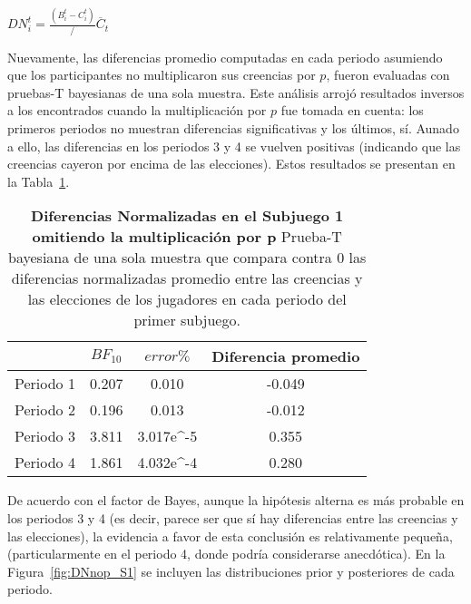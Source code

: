 \begin{center}
$DN_i^t=  \frac{(B_i^t- C_i^t)}/{\overline{C}_t}$ \\
\end{center}

Nuevamente, las diferencias promedio computadas en cada periodo asumiendo que los participantes no multiplicaron sus creencias por $p$, fueron evaluadas con pruebas-T bayesianas de una sola muestra.  Este análisis arrojó resultados inversos a los encontrados cuando la multiplicación por $p$ fue tomada en cuenta: los primeros periodos no muestran diferencias significativas y los últimos, sí.  Aunado a ello, las diferencias en los periodos 3 y 4 se vuelven positivas (indicando que las creencias cayeron por encima de las elecciones). Estos resultados se presentan en la Tabla~\ref{DNnop-S1-B}.\\


\begin{table}[h]
\caption[Prueba t de una muestra: Diferencias Normalizadas en el Subjuego 1 sin la multiplicación por p]{\textbf{Diferencias Normalizadas en el Subjuego 1 omitiendo la multiplicación por p} Prueba-T bayesiana de una sola muestra que compara contra 0 las diferencias normalizadas promedio entre las creencias y las elecciones de los jugadores en cada periodo del primer subjuego.}
\label{DNnop-S1-B}
\centering
\begin{tabular}{l | c c | c}
\toprule
\textbf{} & \textbf{$BF_{10}$} & \textbf{$error\%$} & \textbf{Diferencia promedio}\\
\midrule
Periodo 1 & 0.207 & 0.010 & -0.049\\
Periodo 2 & 0.196 & 0.013 & -0.012\\
Periodo 3 & 3.811 & 3.017e^-5 & 0.355\\
Periodo 4 & 1.861 & 4.032e^-4 & 0.280\\
\bottomrule
\end{tabular}
\end{table}

De acuerdo con el factor de Bayes, aunque la hipótesis alterna es más probable en los periodos 3 y 4 (es decir, parece ser que sí hay diferencias entre las creencias y las elecciones), la evidencia a favor de esta conclusión es relativamente pequeña, (particularmente en el periodo 4, donde podría considerarse anecdótica). En la Figura~\ref{fig:DNnop_S1} se incluyen las distribuciones prior y posteriores de cada periodo.\\

